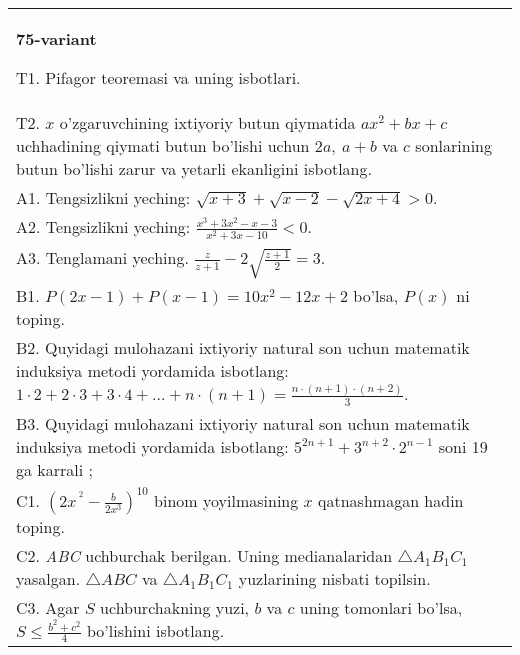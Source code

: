 \documentclass{article}
\begin{document}
\begin{tabular}{m{17cm}}
\textbf{75-variant}
\newline

T1. Pifagor teoremasi va uning isbotlari. \\
T2. \(x\) o'zgaruvchining ixtiyoriy butun qiymatida \(ax^{2} + bx + c\) uchhadining qiymati butun bo'lishi uchun \(2a,\ a + b\) va \(c\) sonlarining butun bo'lishi zarur va yetarli ekanligini isbotlang. \\
A1. Tengsizlikni yeching: \(\sqrt{x + 3} + \sqrt{x - 2} - \sqrt{2x + 4} > 0\). \\
A2. Tengsizlikni yeching: \(\frac{x^{3} + 3x^{2} - x - 3}{x^{2} + 3x - 10} < 0\). \\
A3. Tenglamani yeching. \(\frac{z}{z + 1} - 2\sqrt{\frac{z + 1}{2}} = 3\). \\
B1. \(P(2x - 1) + P(x - 1) = 10x^{2} - 12x + 2\) bo'lsa, \(P(x)\) ni toping. \\
B2. Quyidagi mulohazani ixtiyoriy natural son uchun matematik induksiya metodi yordamida isbotlang: \(1 \cdot 2 + 2 \cdot 3 + 3 \cdot 4 + \ldots + n \cdot (n + 1) = \frac{n \cdot (n + 1) \cdot (n + 2)}{3}\). \\
B3. Quyidagi mulohazani ixtiyoriy natural son uchun matematik induksiya metodi yordamida isbotlang: \(5^{2n + 1} + 3^{n + 2} \cdot 2^{n - 1}\) soni 19 ga karrali ; \\
C1. \(\left( 2x^{\ ^{2}} - \frac{b}{2x^{3}} \right)^{10}\) binom yoyilmasining \(x\) qatnashmagan hadin toping. \\
C2. \emph{ABC} uchburchak berilgan. Uning medianalaridan \(\bigtriangleup A_{1}B_{1}C_{1}\) yasalgan. \(\bigtriangleup ABC\) va \(\bigtriangleup A_{1}B_{1}C_{1}\) yuzlarining nisbati topilsin. \\
C3. Agar \(S\) uchburchakning yuzi, \(b\) va \(c\) uning tomonlari bo'lsa, \(S \leq \frac{b^{2} + c^{2}}{4}\) bo'lishini isbotlang. \\

\end{tabular}
\vspace{1cm}
\end{document}
